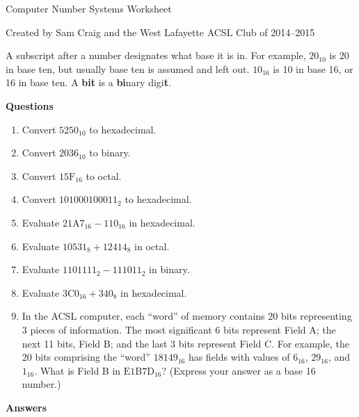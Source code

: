 \documentclass[12pt,letterpaper]{article}
\begin{document}
\begin{center}
  Computer Number Systems Worksheet

  Created by Sam Craig and the West Lafayette ACSL Club of 2014--2015
\end{center}

A subscript after a number designates what base it is in.
For example, $20_{10}$ is 20 in base ten, but usually base ten is assumed and left out.
$10_{16}$ is 10 in base 16, or 16 in base ten.
A \textbf{bit} is a \textbf{bi}nary digi\textbf{t}.

\bigskip
\noindent \textbf{Questions}

\begin{enumerate}

\item Convert $5250_{10}$ to hexadecimal.

\item Convert $2036_{10}$ to binary.

\item Convert $15\textrm{F}_{16}$ to octal.

\item Convert $101000100011_2$ to hexadecimal.

\item Evaluate $21\textrm{A}7_{16} - 110_{16}$ in hexadecimal.

\item Evaluate $10531_8 + 12414_8$ in octal.

\item Evaluate $1101111_2 - 111011_2$ in binary.

\item Evaluate $3\textrm{C}0_{16} + 340_8$ in hexadecimal.

\item In the ACSL computer, each ``word'' of memory
  contains 20 bits representing 3 pieces of information.
  The most significant 6 bits represent Field A; the next
  11 bits, Field B; and the last 3 bits represent Field C.
  For example, the 20 bits comprising the ``word''
  $18149_{16}$ has fields with values of $6_{16}$, $29_{16}$,
  and $1_{16}$. What is Field B in $\textrm{E}1\textrm{B}7\textrm{D}_{16}$? (Express your answer as
  a base 16 number.)

\end{enumerate}

\pagebreak

\noindent \textbf{Answers}
\end{document}
